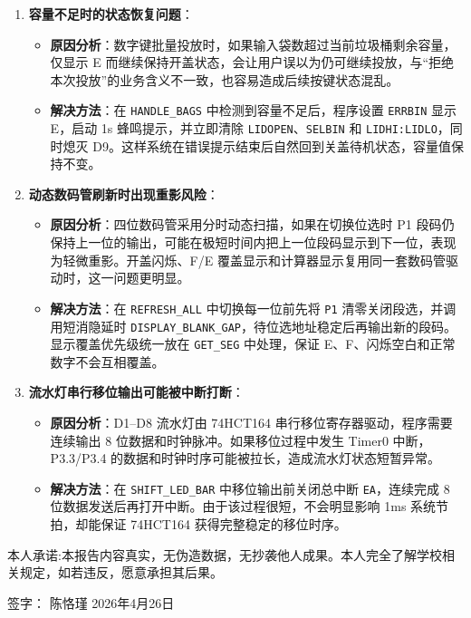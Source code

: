 \documentclass[12pt,a4paper]{article}
\begin{document}
\begin{enumerate}
    \item \textbf{容量不足时的状态恢复问题}：
    \begin{itemize}
        \item \textbf{原因分析}：数字键批量投放时，如果输入袋数超过当前垃圾桶剩余容量，仅显示 E 而继续保持开盖状态，会让用户误以为仍可继续投放，与“拒绝本次投放”的业务含义不一致，也容易造成后续按键状态混乱。
        \item \textbf{解决方法}：在 \texttt{HANDLE\_BAGS} 中检测到容量不足后，程序设置 \texttt{ERRBIN} 显示 E，启动 1s 蜂鸣提示，并立即清除 \texttt{LIDOPEN}、\texttt{SELBIN} 和 \texttt{LIDHI:LIDLO}，同时熄灭 D9。这样系统在错误提示结束后自然回到关盖待机状态，容量值保持不变。
    \end{itemize}

    \item \textbf{动态数码管刷新时出现重影风险}：
    \begin{itemize}
        \item \textbf{原因分析}：四位数码管采用分时动态扫描，如果在切换位选时 P1 段码仍保持上一位的输出，可能在极短时间内把上一位段码显示到下一位，表现为轻微重影。开盖闪烁、F/E 覆盖显示和计算器显示复用同一套数码管驱动时，这一问题更明显。
        \item \textbf{解决方法}：在 \texttt{REFRESH\_ALL} 中切换每一位前先将 \texttt{P1} 清零关闭段选，并调用短消隐延时 \texttt{DISPLAY\_BLANK\_GAP}，待位选地址稳定后再输出新的段码。显示覆盖优先级统一放在 \texttt{GET\_SEG} 中处理，保证 E、F、闪烁空白和正常数字不会互相覆盖。
    \end{itemize}

    \item \textbf{流水灯串行移位输出可能被中断打断}：
    \begin{itemize}
        \item \textbf{原因分析}：D1--D8 流水灯由 74HCT164 串行移位寄存器驱动，程序需要连续输出 8 位数据和时钟脉冲。如果移位过程中发生 Timer0 中断，P3.3/P3.4 的数据和时钟时序可能被拉长，造成流水灯状态短暂异常。
        \item \textbf{解决方法}：在 \texttt{SHIFT\_LED\_BAR} 中移位输出前关闭总中断 \texttt{EA}，连续完成 8 位数据发送后再打开中断。由于该过程很短，不会明显影响 1ms 系统节拍，却能保证 74HCT164 获得完整稳定的移位时序。
    \end{itemize}

\end{enumerate}

\vspace{2cm}
\noindent
本人承诺:本报告内容真实，无伪造数据，无抄袭他人成果。本人完全了解学校相关规定，如若违反，愿意承担其后果。

\vspace{1cm}
\noindent
签字：\hspace{3cm} 陈恪瑾 \hspace{3cm} 2026年4月26日
\end{document}

